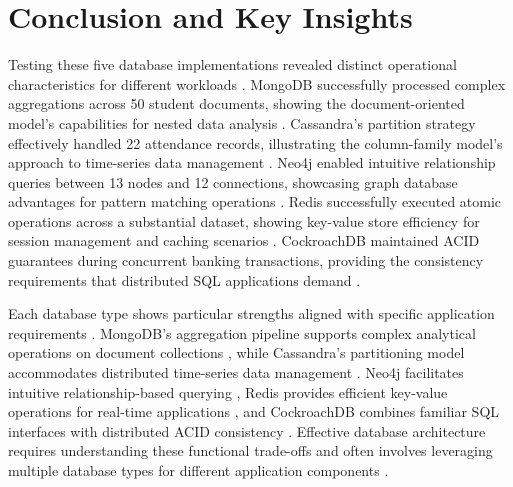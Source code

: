 \chapter{Conclusion and Key Insights}

Testing these five database implementations revealed distinct operational characteristics for different workloads \parencite{nosql_survey}. MongoDB successfully processed complex aggregations across 50 student documents, showing the document-oriented model's capabilities for nested data analysis \parencite{mongodb_architecture}. Cassandra's partition strategy effectively handled 22 attendance records, illustrating the column-family model's approach to time-series data management \parencite{cassandra_architecture}. Neo4j enabled intuitive relationship queries between 13 nodes and 12 connections, showcasing graph database advantages for pattern matching operations \parencite{neo4j_survey}. Redis successfully executed atomic operations across a substantial dataset, showing key-value store efficiency for session management and caching scenarios \parencite{redis_paper}. CockroachDB maintained ACID guarantees during concurrent banking transactions, providing the consistency requirements that distributed SQL applications demand \parencite{cockroachdb_paper}.

Each database type shows particular strengths aligned with specific application requirements \parencite{nosql_performance}. MongoDB's aggregation pipeline supports complex analytical operations on document collections \parencite{mongodb_architecture}, while Cassandra's partitioning model accommodates distributed time-series data management \parencite{cassandra_architecture}. Neo4j facilitates intuitive relationship-based querying \parencite{neo4j_manual}, Redis provides efficient key-value operations for real-time applications \parencite{redis_documentation}, and CockroachDB combines familiar SQL interfaces with distributed ACID consistency \parencite{cockroachdb_paper}. Effective database architecture requires understanding these functional trade-offs and often involves leveraging multiple database types for different application components \parencite{database_systems}.

